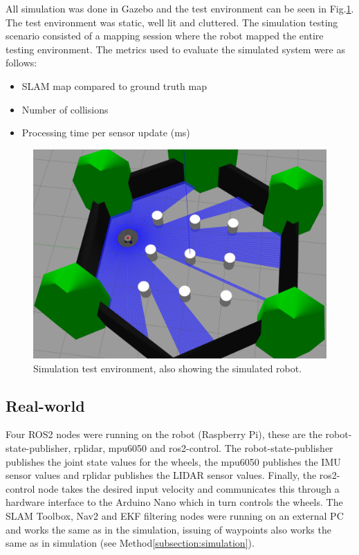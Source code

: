 All simulation was done in Gazebo and the test environment can be seen in Fig.\:\ref{fig:simulation_map}. The test environment was static, well lit and cluttered. 
The simulation testing scenario consisted of a mapping session where the robot mapped the entire testing environment.
The metrics used to evaluate the simulated system were as follows: 
\begin{itemize}
    \item SLAM map compared to ground truth map
    \item Number of collisions
    \item Processing time per sensor update (ms)
\end{itemize}

\begin{figure}
    \centering
    \includegraphics[width=\columnwidth]{images/simulation_map.png}
    \caption{Simulation test environment, also showing the simulated robot.}
    \label{fig:simulation_map}
\end{figure}


\subsection{Real-world}
\label{subsection:real_world}

Four ROS2 nodes were running on the robot (Raspberry Pi), these are the robot-state-publisher, rplidar, mpu6050 and ros2-control. The robot-state-publisher publishes the joint state values for the wheels, the mpu6050 publishes the IMU sensor values and rplidar publishes the LIDAR sensor values.
Finally, the ros2-control node takes the desired input velocity and communicates this through a hardware interface to the Arduino Nano which in turn controls the wheels.
The SLAM Toolbox, Nav2 and EKF filtering nodes were running on an external PC and works the same as in the simulation, issuing of waypoints also works the same as in simulation (see Method\:\ref{subsection:simulation}).

